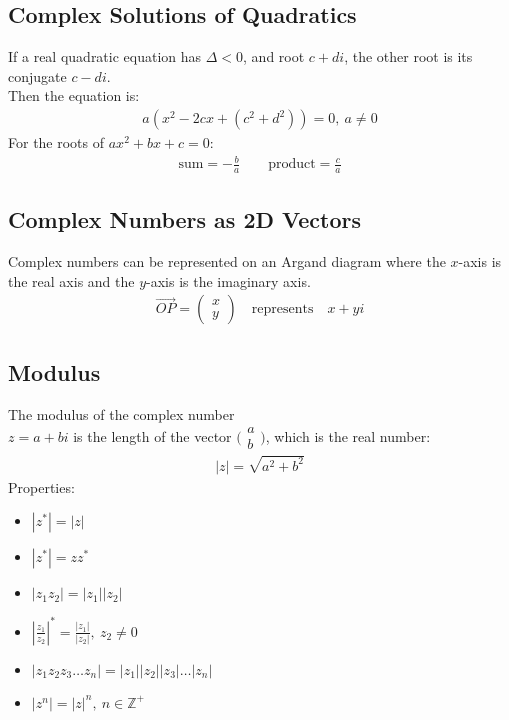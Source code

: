 \documentclass[10pt, a4paper, titlepage]{article}
\begin{document}
\begin{multicols*}{3}
\subsection{Complex Solutions of Quadratics}
If a real quadratic equation has $\Delta <0$, and root $c+di$, the other root is its conjugate $c-di$.\\
Then the equation is:
\begin{align}
	a\left(x^2-2cx+\left(c^2+d^2\right)\right)=0,\ a\neq 0
\end{align}
For the roots of $ax^2+bx+c=0$:
\begin{align}
	\text{sum}=-\frac{b}{a}\qquad \text{product}=\frac{c}{a}
\end{align}
\dotfill
\subsection{Complex Numbers as 2D Vectors}
Complex numbers can be represented on an Argand diagram where the $x$-axis is the real axis and the $y$-axis is the imaginary axis.
\begin{align}
	\overrightarrow{OP}=\begin{pmatrix}x\\ y\end{pmatrix}\quad \text{represents}\quad x+yi
\end{align}
\dotfill
\subsection{Modulus}
The modulus of the complex number \\$z=a+bi$ is the length of the vector $\big(\begin{smallmatrix}a\\ b\end{smallmatrix}\big)$, which is the real number:
\begin{align}
	|z|=\sqrt{a^2+b^2}
\end{align}
Properties:
\begin{itemize}
	\item $|z^*|=|z|$
	\item $|z^*|=zz^*$
	\item $|z_1z_2|=|z_1||z_2|$
	\item $\left|\frac{z_1}{z_2}\right|^*=\frac{|z_1|}{|z_2|},\ z_2\neq 0$
	\item $|z_1z_2z_3\dots z_n|=|z_1||z_2||z_3|\dots |z_n|$
	\item $|z^n|=|z|^n,\ n\in \mathbb{Z}^+$
\end{itemize}
\dotfill

\end{multicols*}
\end{document}

